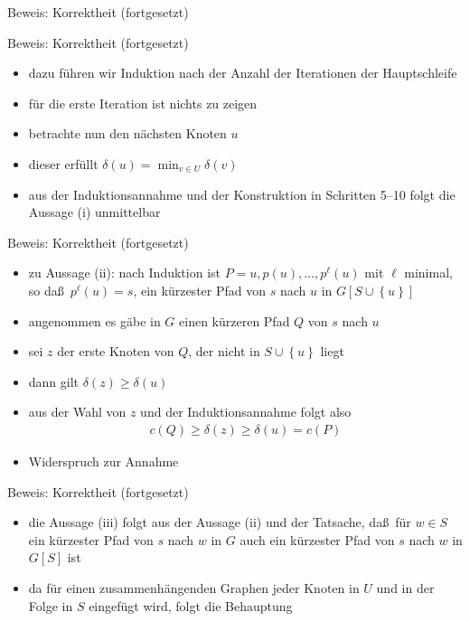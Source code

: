 \documentclass[aspectratio=1610, 11pt]{beamer}
\newcommand\cbc[1]{\left\{{#1}\right\}}
\begin{document}
\begin{frame}
\begin{overprint}
\begin{exampleblock}{Beweis: Korrektheit (fortgesetzt)}
		\end{exampleblock}
		\begin{exampleblock}{Beweis: Korrektheit (fortgesetzt)}
			\begin{itemize}
				\item dazu f\"uhren wir Induktion nach der Anzahl der Iterationen der Hauptschleife
				\item f\"ur die erste Iteration ist nichts zu zeigen
				\item betrachte nun den n\"achsten Knoten $u$
				\item dieser erf\"ullt $\delta(u)=\min_{v\in U}\delta(v)$
				\item aus der Induktionsannahme und der Konstruktion in Schritten 5--10 folgt die Aussage (i) unmittelbar
			\end{itemize}
		\end{exampleblock}
		\begin{exampleblock}{Beweis: Korrektheit (fortgesetzt)}
			\begin{itemize}
				\item zu Aussage (ii): nach Induktion ist $P=u,p(u),\ldots,p^\ell(u)$ mit $\ell$ minimal, so da\ss\ $p^\ell(u)=s$, ein k\"urzester Pfad von $s$ nach $u$ in $G[S\cup\cbc u]$
				\item angenommen es g\"abe in $G$ einen k\"urzeren Pfad $Q$ von $s$ nach $u$
				\item sei $z$ der erste Knoten von $Q$, der nicht in $S\cup\cbc u$ liegt
				\item dann gilt $\delta(z)\geq\delta(u)$
				\item aus der Wahl von $z$ und der Induktionsannahme folgt also
					\begin{align*}
						c(Q)\geq\delta(z)\geq\delta(u)=c(P)
					\end{align*}
				\item Widerspruch zur Annahme
			\end{itemize}
		\end{exampleblock}
		\begin{exampleblock}{Beweis: Korrektheit (fortgesetzt)}
			\begin{itemize}
				\item die Aussage (iii) folgt aus der Aussage (ii) und der Tatsache, da\ss\ f\"ur $w\in S$ ein k\"urzester Pfad von $s$ nach $w$ in $G$ auch ein k\"urzester Pfad von $s$ nach $w$ in $G[S]$ ist
				\item da f\"ur einen zusammenh\"angenden Graphen jeder Knoten in $U$ und in der Folge in $S$ eingef\"ugt wird, folgt die Behauptung
			\end{itemize}
		\end{exampleblock}
	\end{overprint}
\end{frame}
\end{document}
